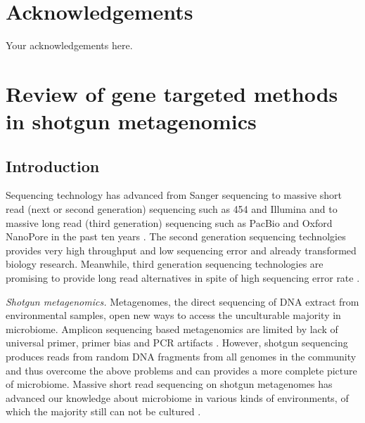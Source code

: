 \documentclass[]{msu-thesis}
\begin{document}
\makecopyrightpage

%
%
\clearpage
\chapter*{Acknowledgements}
\DoubleSpacing %
Your acknowledgements here.
%
\clearpage
\SingleSpacing
\tableofcontents* %
\clearpage
\listoftables %
\clearpage
\listoffigures %
%
%
\mainmatter
%

\chapter{Review of gene targeted methods in shotgun metagenomics}

\section{Introduction}

Sequencing technology has advanced from Sanger sequencing to massive
short read (next or second generation) sequencing such as 454 and
Illumina and to massive long read (third generation) sequencing such
as PacBio and Oxford NanoPore in the past ten years
\cite{mardis_impact_2008,pettersson_generations_2009}. The second
generation sequencing technolgies provides very high throughput and
low sequencing error and already transformed biology
research. Meanwhile, third generation sequencing technologies are
promising to provide long read alternatives in spite of high
sequencing error rate \cite{rhoads_pacbio_2015}.

\textit{Shotgun metagenomics. } Metagenomes, the direct sequencing of
DNA extract from environmental samples, open new ways to access the
unculturable majority in microbiome. Amplicon sequencing based
metagenomics are limited by lack of universal primer, primer bias and
PCR artifacts
\cite{frank_critical_2008,haas_chimeric_2011,guo_microbial_2015}. However,
shotgun sequencing produces reads from random DNA fragments from all
genomes in the community and thus overcome the above problems and can
provides a more complete picture of microbiome. Massive short read
sequencing on shotgun metagenomes has advanced our knowledge about
microbiome in various kinds of environments, of which the majority
still can not be cultured
\cite{howe_tackling_2014,sunagawa_ocean_2015}.
\end{document}
